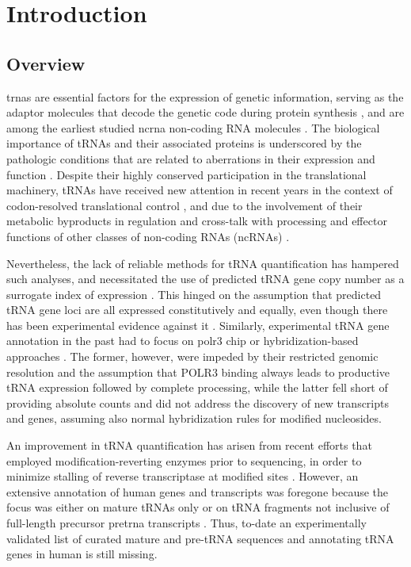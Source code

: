 \documentclass[12pt]{rockefeller}
\begin{document}
\chapter{Introduction}
\section{Overview}
\glspl{trna} are essential factors for the expression of genetic information, serving as the adaptor molecules that decode the genetic code during protein synthesis \cite{Crick:1955}, and are among the earliest studied \gls{ncrna} non-coding RNA molecules \cite{Woese:1967, Soll:1995}. The biological importance of tRNAs and their associated proteins is underscored by the pathologic conditions that are related to aberrations in their expression and function \cite{Cooper:2009da, Park:2008gg, Griffiths:2011ge, McFarland:2004fz}.
Despite their highly conserved participation in the translational machinery, tRNAs have received new attention in recent years in the context of codon-resolved translational control \cite{Dana:2012kq,Dana:2014bs,Mahlab:2012dg,Plotkin:2010fu,Tuller:2010ge,Weinberg:2016kh}, and due to the involvement of their metabolic byproducts in regulation and cross-talk with processing and effector functions of other classes of non-coding RNAs (ncRNAs) \cite{Hasler:2016ce,Ivanov:2011iu,Lee:2009fb,Haussecker:2010hda, Babiarz:2008bs}.

Nevertheless, the lack of reliable methods for tRNA quantification has hampered such analyses, and necessitated the use of predicted tRNA gene copy number as a surrogate index of expression \cite{Iben:2014dt,Pechmann:2012ey,Tuller:2010ge}. This hinged on the assumption that predicted tRNA gene loci are all expressed constitutively and equally, even though there has been experimental evidence against it \cite{Gingold:2014iz}. Similarly, experimental tRNA gene annotation in the past had to focus on \gls{polr3} \gls{chip} \cite{Moqtaderi:2010hc, Oler:2010fb, Kutter:2011ff} or hybridization-based approaches \cite{Dittmar:2004fb, Goodarzi:2016gd}. The former, however, were impeded by their restricted genomic resolution and the assumption that POLR3 binding always leads to productive tRNA expression followed by complete processing, while the latter fell short of providing absolute counts and did not address the discovery of new transcripts and genes, assuming also normal hybridization rules for modified nucleosides.

An improvement in tRNA quantification has arisen from recent efforts that employed modification-reverting enzymes prior to sequencing, in order to minimize stalling of reverse transcriptase at modified sites \cite{Cozen:2015ds, Zheng:2015dw}. However, an extensive annotation of human genes and transcripts was foregone because the focus was either on mature tRNAs only \cite{Zheng:2015dw} or on tRNA fragments not inclusive of full-length precursor \gls{pretrna} transcripts \cite{Cozen:2015ds}. Thus, to-date an experimentally validated list of curated mature and pre-tRNA sequences and annotating tRNA genes in human is still missing.
\end{document}
